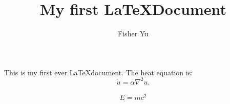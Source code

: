 \documentclass{article}
\title{My first \LaTeX Document}  %
\author{Fisher Yu}
\begin{document}
\maketitle
This is my first ever \LaTeX document. The heat equation is:
\begin{equation}
  \dot{u} = \alpha \nabla^2 u.
\end{equation}

\begin{align*}
E = mc^2
\end{align*}
\end{document}
